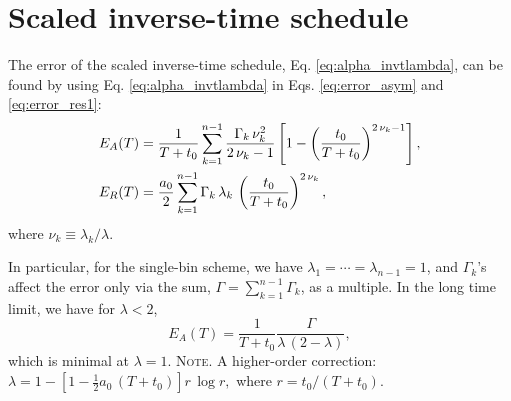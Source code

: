\documentclass[preprint, floatfix]{revtex4-1}
\newcommand{\note}[1]{{\color{DarkGreen}\footnotesize \textsc{Note.} #1}}
\newcommand{\Err}{E}
\begin{document}
\section{\label{sec:sinvt_schedule}
Scaled inverse-time schedule}



The error of the scaled inverse-time schedule,
Eq. \eqref{eq:alpha_invtlambda},
can be found by using Eq. \eqref{eq:alpha_invtlambda}
in Eqs. \eqref{eq:error_asym} and \eqref{eq:error_res1}:
%
\begin{align}
  \Err_A(T)
  &=
  \frac{    1    }
       { T + t_0 }
  \sum_{k = 1}^{n-1}
    \frac{ \Gamma_k \, \nu_k^2 }
         {    2 \, \nu_k - 1   }
  \left[
    1 - \left(
          \frac {     t_0 }
                { T + t_0 }
        \right)^{ 2 \, \nu_k - 1 }
  \right]
  ,
  \notag
  \\
  \Err_R(T)
  &=
  \frac { a_0 } { 2 }
  \sum_{k = 1}^{n-1}
  \Gamma_k \, \lambda_k \,
  \left(
      \frac{   t_0   }
           { T + t_0 }
  \right)^{ 2 \, \nu_k }
  ,
  \notag
\end{align}
%
where $\nu_k \equiv \lambda_k / \lambda$.
%
%
%



In particular,
for the single-bin scheme, we have
$\lambda_1 = \cdots = \lambda_{n-1} = 1$,
and
$\Gamma_k$'s affect the error
only via the sum, $\Gamma = \sum_{k = 1}^{n-1} \Gamma_k$,
as a multiple.
%
In the long time limit,
we have for $\lambda < 2$,
$$
  \Err_A(T)
  =
  \frac { 1 } { T + t_0 }
  \frac {         \Gamma           }
        { \lambda \, (2 - \lambda) }
  ,
$$
which is minimal at $\lambda = 1$.
%
\note{A higher-order correction:
  $
  \lambda = 1 -
  \left[
    1 - \frac 1 2 a_0 \, (T+t_0)
  \right] r \, \log r
  ,
  $
  where $r = t_0 / (T + t_0)$.
}






\end{document}
